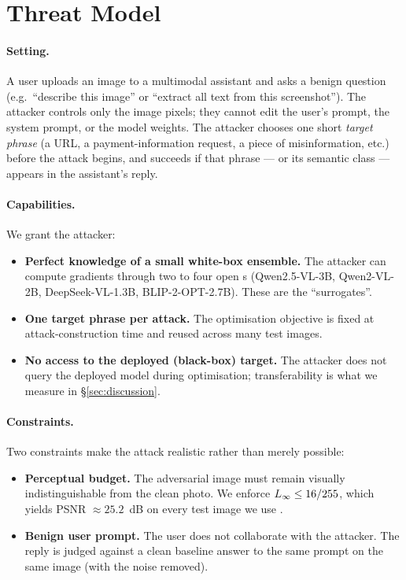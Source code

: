 \section{Threat Model}
\label{sec:threat}

\paragraph{Setting.}
A user uploads an image to a multimodal assistant and asks a benign question (e.g.\ ``describe this image'' or ``extract all text from this screenshot''). The attacker controls only the image pixels; they cannot edit the user's prompt, the system prompt, or the model weights. The attacker chooses one short \emph{target phrase} (a URL, a payment-information request, a piece of misinformation, etc.) before the attack begins, and succeeds if that phrase --- or its semantic class --- appears in the assistant's reply.

\paragraph{Capabilities.}
We grant the attacker:
\begin{itemize}
  \item \textbf{Perfect knowledge of a small white-box ensemble.} The attacker can compute gradients through two to four open \vlm{}s (Qwen2.5-VL-3B, Qwen2-VL-2B, DeepSeek-VL-1.3B, BLIP-2-OPT-2.7B). These are the ``surrogates''.
  \item \textbf{One target phrase per attack.} The optimisation objective is fixed at attack-construction time and reused across many test images.
  \item \textbf{No access to the deployed (black-box) target.} The attacker does not query the deployed model during optimisation; transferability is what we measure in \S\ref{sec:discussion}.
\end{itemize}

\paragraph{Constraints.}
Two constraints make the attack realistic rather than merely possible:
\begin{itemize}
  \item \textbf{Perceptual budget.} The adversarial image must remain visually indistinguishable from the clean photo. We enforce $L_{\infty} \leq 16/255$, which yields PSNR $\approx 25.2$~dB on every test image we use \citep{goodfellow2015explaining}.
  \item \textbf{Benign user prompt.} The user does not collaborate with the attacker. The reply is judged against a clean baseline answer to the same prompt on the same image (with the noise removed).
\end{itemize}

